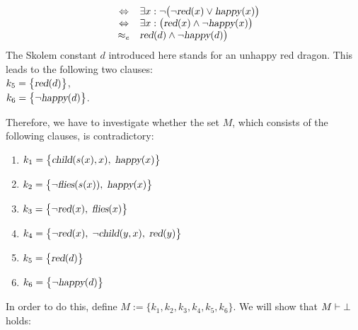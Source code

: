\begin{enumerate}
$$\begin{array}{lcl}
                  & \Leftrightarrow & \exists x: \neg \bigl(\neg \textsl{red}(x) \vee \textsl{happy}(x) \bigr) \\
                  & \Leftrightarrow & \exists x: \bigl(\textsl{red}(x) \wedge \neg \textsl{happy}(x) \bigr)\\
                  & \approx_e & \textsl{red}(d) \wedge \neg \textsl{happy}(d) \bigr)\\
        \end{array}
      $$
      The Skolem constant $d$ introduced here stands for an unhappy red dragon.
      This leads to the following two clauses: \\[0.2cm]
      \hspace*{1.3cm} $k_5 = \bigl\{ \textsl{red}(d) \bigl\}$, \\[0.2cm]
      \hspace*{1.3cm} $k_6 = \bigl\{ \neg \textsl{happy}(d) \bigl\}$.
\end{enumerate}
Therefore, we have to investigate whether the set $M$, which consists of the following clauses, is contradictory:
\begin{enumerate}
\item $k_1 = \bigl\{ \textsl{child}(s(x),x),\; \textsl{happy}(x) \bigl\}$  
\item $k_2 = \bigl\{ \neg \textsl{flies}(s(x)),\; \textsl{happy}(x) \bigl\}$
\item $k_3 = \bigl\{ \neg \textsl{red}(x),\; \textsl{flies}(x) \bigl\}$
\item $k_4 = \bigl\{ \neg \textsl{red}(x),\; \neg \textsl{child}(y,x),\; \textsl{red}(y) \bigl\}$
\item $k_5 = \bigl\{ \textsl{red}(d) \bigl\}$ 
\item $k_6 = \bigl\{ \neg \textsl{happy}(d) \bigl\}$
\end{enumerate}
In order to do this, define $M := \bigl\{k_1,k_2,k_3,k_4,k_5,k_6\bigl\}$.
We will show that $M \vdash \bot$ holds:
